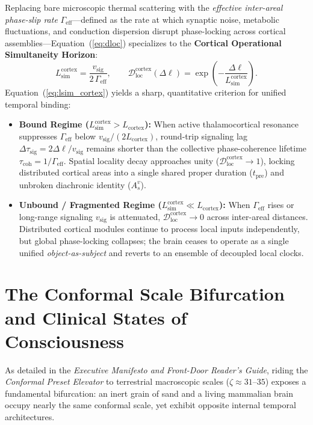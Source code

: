 \documentclass[11pt,a4paper]{article}
\begin{document}
Replacing bare microscopic thermal scattering with the \emph{effective inter-areal phase-slip rate} $\Gamma_{\mathrm{eff}}$—defined as the rate at which synaptic noise, metabolic fluctuations, and conduction dispersion disrupt phase-locking across cortical assemblies—Equation~(\ref{eq:dloc}) specializes to the \textbf{Cortical Operational Simultaneity Horizon}:
\begin{equation}
    L_{\mathrm{sim}}^{\mathrm{cortex}} = \frac{v_{\mathrm{sig}}}{2\,\Gamma_{\mathrm{eff}}}, \qquad \mathcal{D}_{\mathrm{loc}}^{\mathrm{cortex}}(\Delta\ell) = \exp\!\left(-\frac{\Delta\ell}{L_{\mathrm{sim}}^{\mathrm{cortex}}}\right).
    \label{eq:lsim_cortex}
\end{equation}
Equation~(\ref{eq:lsim_cortex}) yields a sharp, quantitative criterion for unified temporal binding:
\begin{itemize}
    \item \textbf{Bound Regime ($L_{\mathrm{sim}}^{\mathrm{cortex}} > L_{\mathrm{cortex}}$):} When active thalamocortical resonance suppresses $\Gamma_{\mathrm{eff}}$ below $v_{\mathrm{sig}} / (2 L_{\mathrm{cortex}})$, round-trip signaling lag $\Delta\tau_{\mathrm{sig}} = 2\Delta\ell / v_{\mathrm{sig}}$ remains shorter than the collective phase-coherence lifetime $\tau_{\mathrm{coh}} = 1/\Gamma_{\mathrm{eff}}$. Spatial locality decay approaches unity ($\mathcal{D}_{\mathrm{loc}}^{\mathrm{cortex}} \to 1$), locking distributed cortical areas into a single shared proper duration ($t_{\mathrm{pre}}$) and unbroken diachronic identity ($A_s^v$).
    \item \textbf{Unbound / Fragmented Regime ($L_{\mathrm{sim}}^{\mathrm{cortex}} \ll L_{\mathrm{cortex}}$):} When $\Gamma_{\mathrm{eff}}$ rises or long-range signaling $v_{\mathrm{sig}}$ is attenuated, $\mathcal{D}_{\mathrm{loc}}^{\mathrm{cortex}} \to 0$ across inter-areal distances. Distributed cortical modules continue to process local inputs independently, but global phase-locking collapses; the brain ceases to operate as a single unified \emph{object-as-subject} and reverts to an ensemble of decoupled local clocks.
\end{itemize}

\section{The Conformal Scale Bifurcation and Clinical States of Consciousness}
As detailed in the \emph{Executive Manifesto and Front-Door Reader's Guide}, riding the \emph{Conformal Preset Elevator} to terrestrial macroscopic scales ($\zeta \approx 31$--$35$) exposes a fundamental bifurcation: an inert grain of sand and a living mammalian brain occupy nearly the same conformal scale, yet exhibit opposite internal temporal architectures.
\end{document}
